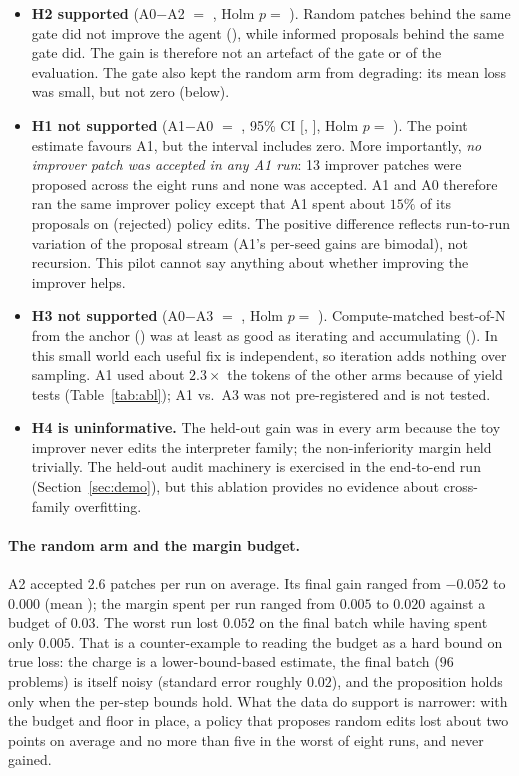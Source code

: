 \begin{itemize}\setlength\itemsep{2pt}
\item \textbf{H2 supported} (A0$-$A2 $=$ \HTwoMean{}, Holm $p=$ \HTwoHolm). Random patches behind the same gate did not improve the agent (\GainATwo{}), while informed proposals behind the same gate did. The gain is therefore not an artefact of the gate or of the evaluation. The gate also kept the random arm from degrading: its mean loss was small, but not zero (below).
\item \textbf{H1 not supported} (A1$-$A0 $=$ \HOneMean{}, 95\% CI $[$\HOneLo{}, \HOneHi{}$]$, Holm $p=$ \HOneHolm). The point estimate favours A1, but the interval includes zero. More importantly, \emph{no improver patch was accepted in any A1 run}: 13 improver patches were proposed across the eight runs and none was accepted. A1 and A0 therefore ran the same improver policy except that A1 spent about $15\%$ of its proposals on (rejected) policy edits. The positive difference reflects run-to-run variation of the proposal stream (A1's per-seed gains are bimodal), not recursion. This pilot cannot say anything about whether improving the improver helps.
\item \textbf{H3 not supported} (A0$-$A3 $=$ \HThreeMean{}, Holm $p=$ \HThreeHolm). Compute-matched best-of-N from the anchor (\GainAThree{}) was at least as good as iterating and accumulating (\GainAZero{}). In this small world each useful fix is independent, so iteration adds nothing over sampling. A1 used about $2.3\times$ the tokens of the other arms because of yield tests (Table~\ref{tab:abl}); A1 vs.\ A3 was not pre-registered and is not tested.
\item \textbf{H4 is uninformative.} The held-out gain was \HeldAZero{} in every arm because the toy improver never edits the interpreter family; the non-inferiority margin held trivially. The held-out audit machinery is exercised in the end-to-end run (Section~\ref{sec:demo}), but this ablation provides no evidence about cross-family overfitting.
\end{itemize}

\paragraph{The random arm and the margin budget.} A2 accepted $2.6$ patches per run on average. Its final gain ranged from $-0.052$ to $0.000$ (mean \GainATwo{}); the margin spent per run ranged from $0.005$ to $0.020$ against a budget of $0.03$. The worst run lost $0.052$ on the final batch while having spent only $0.005$.
That is a counter-example to reading the budget as a hard bound on true loss: the charge is a lower-bound-based estimate, the final batch ($96$ problems) is itself noisy (standard error roughly $0.02$), and the proposition holds only when the per-step bounds hold. What the data do support is narrower: with the budget and floor in place, a policy that proposes random edits lost about two points on average and no more than five in the worst of eight runs, and never gained.

